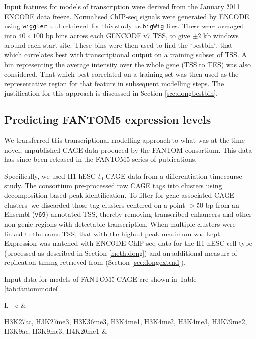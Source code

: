 \documentclass[a4paper,11pt,oneside]{book}
\begin{document}
Input features for models of transcription were derived from the January 2011 ENCODE data freeze.\cite{Dunham2012} Normalised ChIP-seq signals were generated by ENCODE using \texttt{wiggler} and retrieved for this study as \texttt{bigWig} files. These were averaged into $40 \times 100$ bp bins across each GENCODE v7 TSS, to give $\pm 2$ kb windows around each start site. These bins were then used to find the `bestbin`, that which correlates best with transcriptional output on a training subset of TSS.\cite{Dong2012}  A bin representing the average intensity over the whole gene (TSS to TES) was also considered. That which best correlated on a training set was then used as the representative region for that feature in subsequent modelling steps.\cite{Dong2012} The justification for this approach is discussed in Section \ref{sec:dongbestbin}.

\subsection{Predicting FANTOM5 expression levels}\label{meth:fantom5}

We transferred this transcriptional modelling approach to what was at the time novel, unpublished CAGE data produced by the FANTOM consortium. This data has since been released in the FANTOM5 series of publications.\cite{fantom5}

Specifically, we used H1 hESC $t_0$ CAGE data from a differentiation timecourse study. The consortium pre-processed raw CAGE tags into clusters using decomposition-based peak identification.\cite{fantom5} To filter for gene-associated CAGE clusters, we discarded those tag clusters centered on a point $>50$ bp from an Ensembl (\texttt{v69}) annotated TSS, thereby removing transcribed enhancers and other non-genic regions with detectable transcription. When multiple clusters were linked to the same TSS, that with the highest peak maximum was kept. Expression was matched with ENCODE ChIP-seq data for the H1 hESC cell type (processed as described in Section \ref{meth:dong}) and an additional measure of replication timing retrieved from \citet{Ryba2010} (Section \ref{sec:dongextend}).

Input data for models of FANTOM5 CAGE are shown in Table \ref{tab:fantommodel}.

\begin{table}[h]
\centering
\caption{ ENCODE datasets generated in the H1 hESC cell line and used in models of transcriptional output. }
\label{tab:fantommodel}
\begin{tabular}{L |  c} \toprule
{} &
 \\
\midrule

H3K27ac, 
H3K27me3, 
H3K36me3, 
H3K4me1, 
H3K4me2,  
H3K4me3, 
H3K79me2, 
H3K9ac, 
H3K9me3, 
H4K20me1 &

\\

\end{tabular}
\end{table}
\end{document}
